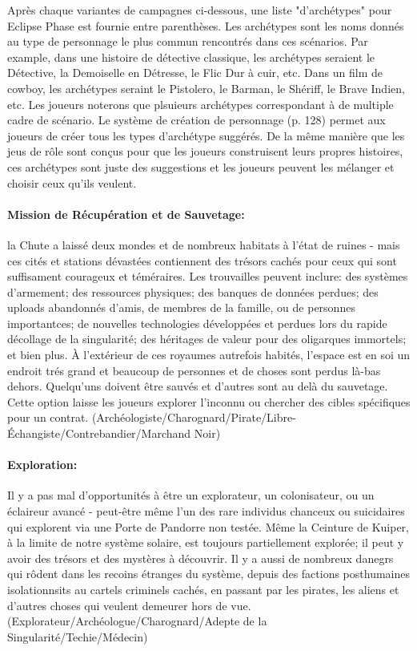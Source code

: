 Après chaque variantes de campagnes ci-dessous, une liste "d'archétypes" pour Eclipse Phase est fournie entre parenthèses. Les archétypes sont les noms donnés au type de personnage le plus commun rencontrés dans ces scénarios. Par example, dans une histoire de détective classique, les archétypes seraient le Détective, la Demoiselle en Détresse, le Flic Dur à cuir, etc. Dans un film de cowboy, les archétypes seraint le Pistolero, le Barman, le Shériff, le Brave Indien, etc. Les joueurs noterons que plsuieurs archétypes correspondant à de multiple cadre de scénario. Le système de création de personnage (p. 128) permet aux joueurs de créer tous les types d'archétype suggérés. De la même manière que les jeus de rôle sont conçus pour que les joueurs construisent leurs propres histoires, ces archétypes sont juste des suggestions et les joueurs peuvent les mélanger et choisir ceux qu'ils veulent. 

\paragraph{Mission de Récupération et de Sauvetage:} la Chute a laissé deux mondes et de nombreux habitats à l'état de ruines - mais ces cités et stations dévastées contiennent des trésors cachés pour ceux qui sont suffisament courageux et téméraires. Les trouvailles peuvent inclure: des systèmes d'armement; des ressources physiques; des banques de données perdues; des uploads abandonnés d'amis, de membres de la famille, ou de personnes importantces; de nouvelles technologies développées et perdues lors du rapide décollage de la singularité; des héritages de valeur pour des oligarques immortels; et bien plus. À l'extérieur de ces royaumes autrefois habités, l'espace est en soi un endroit trés grand et beaucoup de personnes et de choses sont perdus là-bas dehors. Quelqu'uns doivent être sauvés et d'autres sont au delà du sauvetage. Cette option laisse les joueurs explorer l'inconnu ou chercher des cibles spécifiques pour un contrat. (Archéologiste/Charognard/Pirate/Libre-Échangiste/Contrebandier/Marchand Noir) 

\paragraph{Exploration:} Il y a pas mal d'opportunités à être un explorateur, un colonisateur, ou un éclaireur avancé - peut-être même l'un des rare individus chanceux ou suicidaires qui explorent via une Porte de Pandorre non testée. Même la Ceinture de Kuiper, à la limite de notre système solaire, est toujours partiellement explorée; il peut y avoir des trésors et des mystères à découvrir. Il y a aussi de nombreux danegrs qui rôdent dans les recoins étranges du système, depuis des factions posthumaines isolationnsits au cartels criminels cachés, en passant par les pirates, les aliens et d'autres choses qui veulent demeurer hors de vue. (Explorateur/Archéologue/Charognard/Adepte de la Singularité/Techie/Médecin) 

